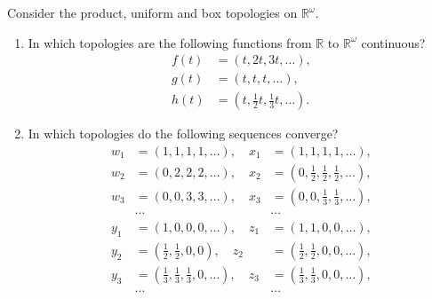 \documentclass[a4paper,12pt, reqno]{article}
\theoremstyle{definition}
\newenvironment{exerr}[1]{
  \renewcommand\theexeralt{#1}
  \exeralt
}{\endexeralt}
\newcommand{\R}{\mathbb{R}}
\begin{document}
\begin{exerr}{4}
  Consider the product, uniform and box topologies on $\R^\omega$.
  \begin{enumerate}[label=(\alph*)]
    \item In which topologies are the following functions from $\R$ to $\R^\omega$ continuous?
          \begin{align*}
            f(t) & = (t,2t,3t,\dots),                        \\
            g(t) & = (t,t,t,\dots),                          \\
            h(t) & = (t,\tfrac{1}{2}t, \tfrac{1}{3}t,\dots).
          \end{align*}
    \item In which topologies do the following sequences converge?
          \begin{equation*}
            \begin{array}{ccc}
              w_{1} & = (1,1,1,1,\dots), \quad x_{1}                                     & = (1,1,1,1,\dots),                                  \\
              w_{2} & = (0,2,2,2,\dots), \quad x_{2}                                     & = (0,\tfrac{1}{2},\tfrac{1}{2},\tfrac{1}{2},\dots), \\
              w_{3} & = (0,0,3,3,\dots), \quad x_{3}                                     & = (0,0, \tfrac{1}{3}, \tfrac{1}{3},\dots),          \\
                    & \cdots                                                             & \cdots                                              \\
              y_{1} & = (1,0,0,0,\dots), \quad z_{1}                                     & = (1,1,0,0,\dots),                                  \\
              y_{2} & = (\tfrac{1}{2},\tfrac{1}{2},0,0), \quad z_{2}                     & = (\tfrac{1}{2},\tfrac{1}{2},0,0,\dots),            \\
              y_{3} & = (\tfrac{1}{3}, \tfrac{1}{3}, \tfrac{1}{3}, 0,\dots), \quad z_{3} & = (\tfrac{1}{3},\tfrac{1}{3},0,0,\dots),            \\
                    & \cdots                                                             & \cdots
            \end{array}
          \end{equation*}
  \end{enumerate}
\end{exerr}
\end{document}
